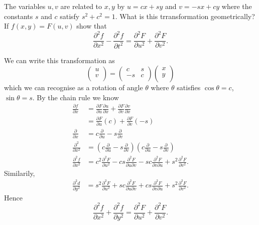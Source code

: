 \question The variables $u, v$ are related to $x, y$ by
$u = cx + sy$ and $v = -sx + cy$
where the constants $s$ and $c$ satisfy
$s^2 + c^2 = 1$.
What is this trransformation geometrically? If 
$f(x, y) = F(u, v)$
show that
\[ \frac{\partial^2 f}{\partial x^2} - \frac{\partial^2 f}{\partial t^2} = \frac{\partial^2 F}{\partial u^2} + \frac{\partial^2 F}{\partial v^2}. \]
\begin{solution}
   We can write this transformation as
   \[ 
        \begin{pmatrix}
            u \\
            v \\
        \end{pmatrix}
        =
        \begin{pmatrix}
            c   & s     \\
            -s  & c     \\
        \end{pmatrix}
        \begin{pmatrix}
            x \\
            y \\
        \end{pmatrix}
   \]
   which we can recognise as a rotation of angle $\theta$ where $\theta$ satisfies $\cos{\theta} = c$, $\sin{\theta} = s$.
   By the chain rule we know
    \begin{align*}
        \frac{\partial f}{\partial x}       &= \frac{\partial F}{\partial u} \frac{\partial u}{\partial x} + 
                                                \frac{\partial F}{\partial v} \frac{\partial v}{\partial x}  \\
                                            &= \frac{\partial F}{\partial u} (c) + 
                                                \frac{\partial F}{\partial v} (-s)                           \\
        \frac{\partial}{\partial x}         &= c \frac{\partial}{\partial u} - s \frac{\partial}{\partial v} \\ 
        \frac{\partial^2}{\partial x^2}     &= \left(c \frac{\partial}{\partial u} 
                                                - s \frac{\partial}{\partial v}\right) 
                                                \left(c \frac{\partial}{\partial u} 
                                                - s \frac{\partial}{\partial v}\right) \\
        \frac{\partial^2 f}{\partial x^2}   &= c^2 \frac{\partial^2 F}{\partial u^2} - cs \frac{\partial^2 F}{\partial u \partial v} - sc \frac{\partial^2 F}{\partial v \partial u} + s^2 \frac{\partial^2 F}{\partial v^2}.
    \end{align*}
    Similarily,
    \begin{align*}
        \frac{\partial^2 d}{\partial y^2} &= s^2 \frac{\partial^2 F}{\partial u^2} + sc \frac{\partial^2 F}{\partial u \partial v} + cs \frac{\partial^2 F}{\partial v \partial u} + s^2 \frac{\partial^2 F}{\partial v^2}.
    \end{align*}
    Hence
    \[ \frac{\partial^2 f}{\partial x^2} + \frac{\partial^2 f}{\partial y^2} = \frac{\partial^2 F}{\partial u^2} + \frac{\partial^2 F}{\partial v^2}. \]
\end{solution}
